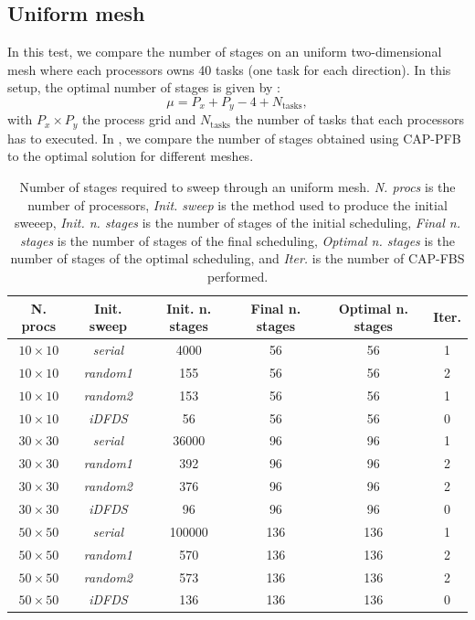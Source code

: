 \documentclass[letterpaper]{article}
\renewcommand{\(}{\left(}
\renewcommand{\)}{\right)}
\renewcommand{\[}{\left[}
\renewcommand{\]}{\right]}
\begin{document}
\subsection{Uniform mesh}
In this test, we compare the number of stages on an uniform two-dimensional mesh 
where each processors owns 40 tasks (one task for each direction). In this
setup, the optimal number of stages is given by \cite{Adams2013}:
\begin{equation}
  \mu = P_x + P_y - 4 + N_{\textrm{tasks}},
\end{equation}
with $P_x \times P_y$ the process grid and $N_{\textrm{tasks}}$ the number of
tasks that each processors has to executed. In , we compare the number of
stages obtained using CAP-PFB to the optimal solution for different meshes.
\begin{table}[H]
  \begin{center}
    \begin{tabular}{|c|c|c|c|c|c|}
      \hline
      N. procs & Init. sweep & Init. n. stages & Final n. stages & Optimal n. stages & Iter. \\
      \hline
      $10\times 10$ & \emph{serial}  &   4000 &  56 &  56 & 1 \\
      $10\times 10$ & \emph{random1} &    155 &  56 &  56 & 2 \\
      $10\times 10$ & \emph{random2} &    153 &  56 &  56 & 1 \\
      $10\times 10$ & \emph{iDFDS}   &     56 &  56 &  56 & 0 \\
      $30\times 30$ & \emph{serial}  &  36000 &  96 &  96 & 1 \\
      $30\times 30$ & \emph{random1} &    392 &  96 &  96 & 2 \\
      $30\times 30$ & \emph{random2} &    376 &  96 &  96 & 2 \\
      $30\times 30$ & \emph{iDFDS}   &     96 &  96 &  96 & 0 \\
      $50\times 50$ & \emph{serial}  & 100000 & 136 & 136 & 1 \\
      $50\times 50$ & \emph{random1} &    570 & 136 & 136 & 2 \\ 
      $50\times 50$ & \emph{random2} &    573 & 136 & 136 & 2 \\
      $50\times 50$ & \emph{iDFDS}   &    136 & 136 & 136 & 0 \\
      \hline
    \end{tabular}
    \caption{Number of stages required to sweep through an uniform mesh.
      \emph{N. procs} is the number of processors, \emph{Init. sweep} is the
      method used to produce the initial sweeep, \emph{Init. n. stages} is the
      number of stages of the initial scheduling, \emph{Final n. stages} is the
      number of stages of the final scheduling, \emph{Optimal n. stages} is the
      number of stages of the optimal scheduling, and \emph{Iter.} is the number
    of CAP-FBS performed.}
    \label{uniform}
  \end{center}
\end{table}
\end{document}
